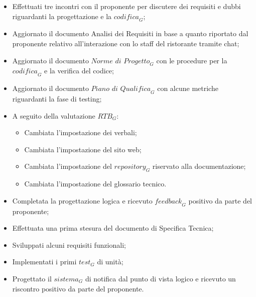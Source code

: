 \begin{itemize}
    \item Effettuati tre incontri con il proponente per discutere dei requisiti e dubbi riguardanti la progettazione e la $\textit{codifica}_G$;
\item Aggiornato il documento Analisi dei Requisiti in base a quanto riportato dal proponente relativo all'interazione con lo staff del ristorante tramite chat;
\item Aggiornato il documento $\textit{Norme di Progetto}_G$ con le procedure per la $\textit{codifica}_G$ e la verifica del codice;
\item Aggiornato il documento $\textit{Piano di Qualifica}_G$ con alcune metriche riguardanti la fase di testing;
\item A seguito della valutazione $\textit{RTB}_G$:
\begin{itemize}
    \item Cambiata l'impostazione dei verbali;
    \item Cambiata l'impostazione del sito web;
    \item Cambiata l'impostazione del $\textit{repository}_G$ riservato alla documentazione;
    \item Cambiata l'impostazione del glossario tecnico.
\end{itemize}
\item Completata la progettazione logica e ricevuto $\textit{feedback}_G$ positivo da parte del proponente;
\item Effettuata una prima stesura del documento di Specifica Tecnica;
\item Sviluppati alcuni requisiti funzionali;
\item Implementati i primi $\textit{test}_G$ di unità;
\item Progettato il $\textit{sistema}_G$ di notifica dal punto di vista logico e ricevuto un riscontro positivo da parte del proponente.
\end{itemize}
